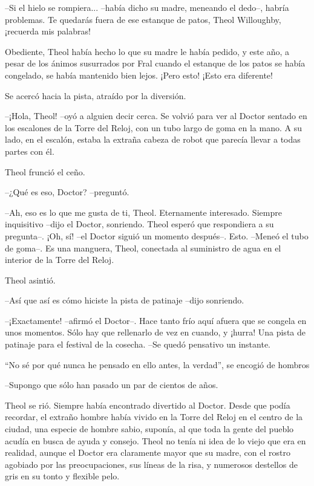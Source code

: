 --Si el hielo se rompiera... --había dicho su madre, meneando el dedo--, habría problemas. Te quedarás fuera de ese estanque de patos, Theol Willoughby, ¡recuerda mis palabras!



Obediente, Theol había hecho lo que su madre le había pedido, y este año, a pesar de los ánimos susurrados por Fral cuando el estanque de los patos se había congelado, se había mantenido bien lejos. ¡Pero esto! ¡Esto era diferente!



Se acercó hacia la pista, atraído por la diversión. 



--¡Hola, Theol! --oyó a alguien decir cerca. Se volvió para ver al Doctor sentado en los escalones de la Torre del Reloj, con un tubo largo de goma en la mano. A su lado, en el escalón, estaba la extraña cabeza de robot que parecía llevar a todas partes con él. 



Theol frunció el ceño.

--¿Qué es eso, Doctor? --preguntó. 



--Ah, eso es lo que me gusta de ti, Theol. Eternamente interesado. Siempre inquisitivo --dijo el Doctor, sonriendo. Theol esperó que respondiera a su pregunta--. ¡Oh, sí! --el Doctor siguió un momento después--. Esto. --Meneó el tubo de goma--. Es una manguera, Theol, conectada al suministro de agua en el interior de la Torre del Reloj. 



Theol asintió.

--Así que así es cómo hiciste la pista de patinaje --dijo sonriendo. 



--¡Exactamente! --afirmó el Doctor--. Hace tanto frío aquí afuera que se congela en unos momentos. Sólo hay que rellenarlo de vez en cuando, y ¡hurra! Una pista de patinaje para el festival de la cosecha. --Se quedó pensativo un instante.

``No sé por qué nunca he pensado en ello antes, la verdad'', se encogió de hombros

--Supongo que sólo han pasado un par de cientos de años. 


Theol se rió. Siempre había encontrado divertido al Doctor. Desde que podía recordar, el extraño hombre había vivido en la Torre del Reloj en el centro de la ciudad, una especie de hombre sabio, suponía, al que toda la gente del pueblo acudía en busca de ayuda y consejo. Theol no tenía ni idea de lo viejo que era en realidad, aunque el Doctor era claramente mayor que su madre, con el rostro agobiado por las preocupaciones, sus líneas de la risa, y numerosos destellos de gris en su tonto y flexible pelo. 



